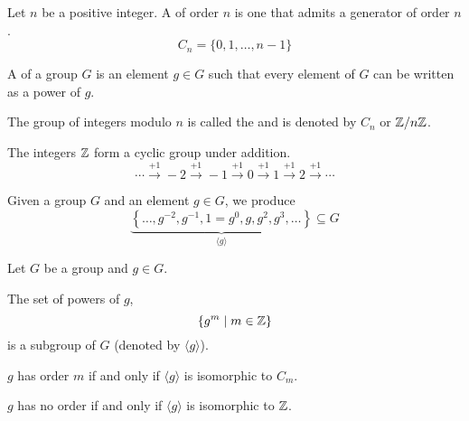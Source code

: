 \begin{definition}\label{def:cyclic-group}
    Let $n$ be a positive integer. A  of order $n$ is one that admits a generator of order $n$. \[
        C_n = \{ 0, 1, \dots, n - 1 \}
    \]
\end{definition}

\begin{definition}[Generator]\label{def:generator}
    A  of a group $G$ is an element $g \in G$ such that every element of $G$ can be written as a power of $g$.
\end{definition}

The group of integers modulo $n$ is called the  and is denoted by $C_n$ or $\mathbb{Z}/n\mathbb{Z}$.

\begin{example}
    The integers $\mathbb{Z}$ form a cyclic group under addition. \[ 
        \cdots \xrightarrow{+1} -2 \xrightarrow{+1} -1 \xrightarrow{+1} 0 \xrightarrow{+1} 1 \xrightarrow{+1} 2 \xrightarrow{+1} \cdots 
    \]
\end{example}

Given a group $G$ and an element $g \in G$, we produce \[
    \underbrace{\left\{ \dots, g^{-2}, g^{-1}, 1 = g^0, g, g^2, g^3, \dots \right\}}_{\langle g \rangle} \subseteq G
\]

\begin{proposition}\label{prop:order-of-cyclic-group}
    Let $G$ be a group and $g \in G$. 

    \begin{listo}
        \item The set of powers of $g$, \[
            \left\{ g^m \mid m \in \mathbb{Z} \right\}
        \] is a subgroup of $G$ (denoted by $\langle g \rangle$).

        \item $g$ has order $m$ if and only if $\langle g \rangle$ is isomorphic to $C_m$.
        
        \item $g$ has no order if and only if $\langle g \rangle$ is isomorphic to $\mathbb{Z}$.
    \end{listo}
\end{proposition}

